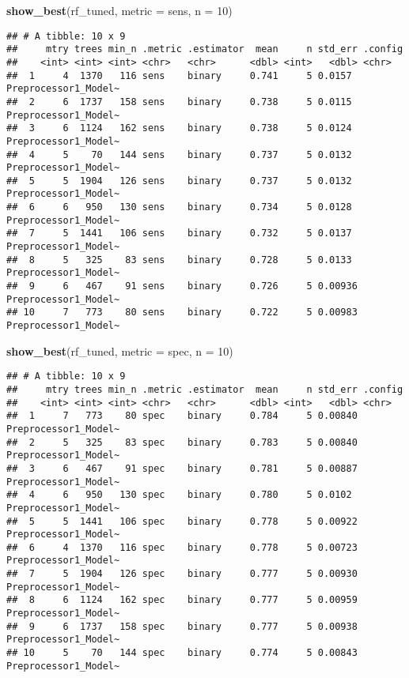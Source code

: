 \documentclass[
]{article}
\newenvironment{Shaded}{\begin{snugshade}}{\end{snugshade}}
\newcommand{\AttributeTok}[1]{\textcolor[rgb]{0.13,0.29,0.53}{#1}}
\newcommand{\DecValTok}[1]{\textcolor[rgb]{0.00,0.00,0.81}{#1}}
\newcommand{\FunctionTok}[1]{\textcolor[rgb]{0.13,0.29,0.53}{\textbf{#1}}}
\newcommand{\NormalTok}[1]{#1}
\newcommand{\StringTok}[1]{\textcolor[rgb]{0.31,0.60,0.02}{#1}}
\begin{document}
\begin{Shaded}
\begin{Highlighting}[]
\FunctionTok{show\_best}\NormalTok{(rf\_tuned, }\AttributeTok{metric =} \StringTok{\textquotesingle{}sens\textquotesingle{}}\NormalTok{, }\AttributeTok{n =} \DecValTok{10}\NormalTok{)}
\end{Highlighting}
\end{Shaded}

\begin{verbatim}
## # A tibble: 10 x 9
##     mtry trees min_n .metric .estimator  mean     n std_err .config             
##    <int> <int> <int> <chr>   <chr>      <dbl> <int>   <dbl> <chr>               
##  1     4  1370   116 sens    binary     0.741     5 0.0157  Preprocessor1_Model~
##  2     6  1737   158 sens    binary     0.738     5 0.0115  Preprocessor1_Model~
##  3     6  1124   162 sens    binary     0.738     5 0.0124  Preprocessor1_Model~
##  4     5    70   144 sens    binary     0.737     5 0.0132  Preprocessor1_Model~
##  5     5  1904   126 sens    binary     0.737     5 0.0132  Preprocessor1_Model~
##  6     6   950   130 sens    binary     0.734     5 0.0128  Preprocessor1_Model~
##  7     5  1441   106 sens    binary     0.732     5 0.0137  Preprocessor1_Model~
##  8     5   325    83 sens    binary     0.728     5 0.0133  Preprocessor1_Model~
##  9     6   467    91 sens    binary     0.726     5 0.00936 Preprocessor1_Model~
## 10     7   773    80 sens    binary     0.722     5 0.00983 Preprocessor1_Model~
\end{verbatim}

\begin{Shaded}
\begin{Highlighting}[]
\FunctionTok{show\_best}\NormalTok{(rf\_tuned, }\AttributeTok{metric =} \StringTok{\textquotesingle{}spec\textquotesingle{}}\NormalTok{, }\AttributeTok{n =} \DecValTok{10}\NormalTok{)}
\end{Highlighting}
\end{Shaded}

\begin{verbatim}
## # A tibble: 10 x 9
##     mtry trees min_n .metric .estimator  mean     n std_err .config             
##    <int> <int> <int> <chr>   <chr>      <dbl> <int>   <dbl> <chr>               
##  1     7   773    80 spec    binary     0.784     5 0.00840 Preprocessor1_Model~
##  2     5   325    83 spec    binary     0.783     5 0.00840 Preprocessor1_Model~
##  3     6   467    91 spec    binary     0.781     5 0.00887 Preprocessor1_Model~
##  4     6   950   130 spec    binary     0.780     5 0.0102  Preprocessor1_Model~
##  5     5  1441   106 spec    binary     0.778     5 0.00922 Preprocessor1_Model~
##  6     4  1370   116 spec    binary     0.778     5 0.00723 Preprocessor1_Model~
##  7     5  1904   126 spec    binary     0.777     5 0.00930 Preprocessor1_Model~
##  8     6  1124   162 spec    binary     0.777     5 0.00959 Preprocessor1_Model~
##  9     6  1737   158 spec    binary     0.777     5 0.00938 Preprocessor1_Model~
## 10     5    70   144 spec    binary     0.774     5 0.00843 Preprocessor1_Model~
\end{verbatim}
\end{document}
